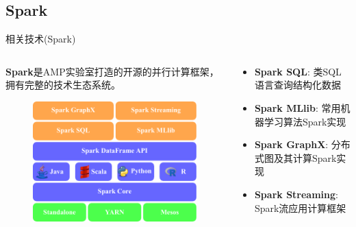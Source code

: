 \subsection{Spark}

\begin{frame}[c]{相关技术(Spark)}
    \begin{columns}
        \begin{column}{0.5 \textwidth}
            \textbf{Spark}是AMP实验室打造的开源的并行计算框架，拥有完整的技术生态系统。

            \vspace{0.5em}
            \begin{figure}
                \centering
                \includegraphics[scale=0.6]{figures/spark.pdf}
            \end{figure}            
        \end{column}

        
        \pause
        \begin{column}{0.5 \textwidth}
            \begin{itemize}
                \item \textbf{Spark SQL}: 类SQL语言查询结构化数据
                \item \textbf{Spark MLlib}: 常用机器学习算法Spark实现
                \item \textbf{Spark GraphX}: 分布式图及其计算Spark实现
                \item \textbf{Spark Streaming}: Spark流应用计算框架
            \end{itemize}
        \end{column}
    \end{columns}
\end{frame}

